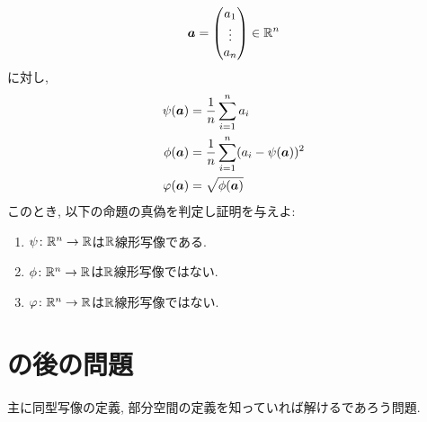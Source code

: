\begin{quiz}
\begin{align*}
  \boldsymbol{a}=\begin{pmatrix}a_1\\\vdots\\a_n\end{pmatrix}\in\mathbb{R}^n
\end{align*}
に対し,
\begin{align*}
  \psi(\boldsymbol{a})&=\frac{1}{n}\sum_{i=1}^n a_i\\
  \phi(\boldsymbol{a})&=\frac{1}{n}\sum_{i=1}^n (a_i - \psi(\boldsymbol{a}))^2\\
  \varphi(\boldsymbol{a})&=\sqrt{\phi(\boldsymbol{a})}
\end{align*}
このとき,
以下の命題の真偽を判定し証明を与えよ:
\begin{enumerate}
  \item $\psi\colon \mathbb{R}^n\to \mathbb{R}$は$\mathbb{R}$線形写像である.
  \item $\phi\colon \mathbb{R}^n\to \mathbb{R}$は$\mathbb{R}$線形写像ではない.
  \item $\varphi\colon \mathbb{R}^n\to \mathbb{R}$は$\mathbb{R}$線形写像ではない.
\end{enumerate}
\end{quiz}


\section{の後の問題}
主に同型写像の定義, 部分空間の定義を知っていれば解けるであろう問題.
